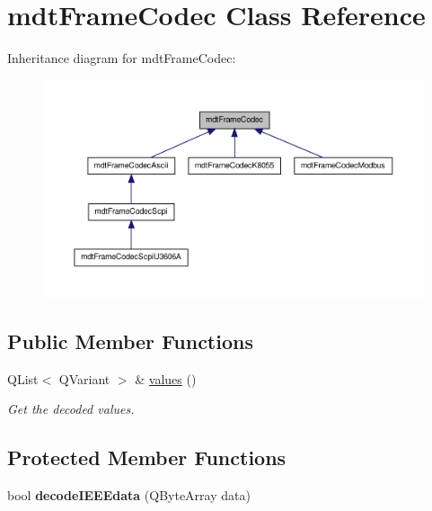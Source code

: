 \hypertarget{classmdt_frame_codec}{
\section{mdtFrameCodec Class Reference}
\label{classmdt_frame_codec}
}


Inheritance diagram for mdtFrameCodec:\nopagebreak
\begin{figure}[H]
\begin{center}
\leavevmode
\includegraphics[width=400pt]{classmdt_frame_codec__inherit__graph}
\end{center}
\end{figure}
\subsection*{Public Member Functions}
\begin{DoxyCompactItemize}
\item 
\hypertarget{classmdt_frame_codec_a2c0cc0f9d9b72ef2295b7ec7eca72ea7}{
QList$<$ QVariant $>$ \& \hyperlink{classmdt_frame_codec_a2c0cc0f9d9b72ef2295b7ec7eca72ea7}{values} ()}
\label{classmdt_frame_codec_a2c0cc0f9d9b72ef2295b7ec7eca72ea7}

\begin{DoxyCompactList}\small\item\em Get the decoded values. \end{DoxyCompactList}\end{DoxyCompactItemize}
\subsection*{Protected Member Functions}
\begin{DoxyCompactItemize}
\item 
\hypertarget{classmdt_frame_codec_a6a47e1739b13c72883a01f5dd4bcffb6}{
bool {\bfseries decodeIEEEdata} (QByteArray data)}
\label{classmdt_frame_codec_a6a47e1739b13c72883a01f5dd4bcffb6}

\end{DoxyCompactItemize}
